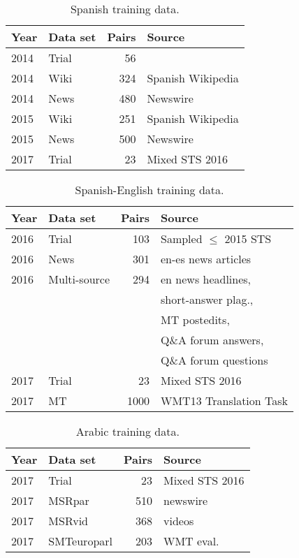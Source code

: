 \documentclass[11pt,a4paper]{article}
\begin{document}
\begin{table}[t]
\small
\begin{center}
\begin{tabular}{|l|l|r|l|} 
\hline
     Year & Data set         & Pairs &  Source\\
\hline
2014 & Trial & 56 & \\
2014 & Wiki  & 324 & Spanish Wikipedia \\
2014 & News  & 480 & Newswire \\
2015 & Wiki  & 251 & Spanish Wikipedia \\
2015 & News  & 500 & Newswire \\
2017 & Trial & 23 & Mixed STS 2016 \\
\hline
\end{tabular}
\end{center}
\caption{Spanish training data.
}
\label{tab:es-summary}
\end{table}


\begin{table}[t]
\small
\begin{center}
\begin{tabular}{|l|l|r|l|} 
\hline
     Year & Data set         & Pairs &  Source\\
\hline
2016 & Trial & 103 & Sampled $\leq$ 2015 STS\\
2016 & News    & 301  & en-es news articles \\
2016 & Multi-source   & 294 & en news headlines, \\
     &                & &  short-answer plag., \\
     &                & & MT postedits,   \\
     &               & & Q\&A forum answers, \\
     &               & & Q\&A forum questions \\
2017 & Trial & 23 & Mixed STS 2016 \\
2017 & MT & 1000 & WMT13 Translation Task \\
\hline
\end{tabular}
\end{center}
\caption{Spanish-English training data.
}
\label{tab:es-en-summary}
\end{table}


\begin{table}[t]
\small
\begin{center}
\begin{tabular}{|l|l|r|l|} 
\hline
     Year & Data set         & Pairs &  Source\\
\hline
2017 & Trial & 23 & Mixed STS 2016 \\
2017 & MSRpar & 510 & newswire\\
2017 & MSRvid & 368 & videos\\
2017 & SMTeuroparl & 203 & WMT eval.\\
\hline
\end{tabular}
\end{center}
\caption{Arabic training data.
}
\label{tab:ar-summary}
\end{table}
\end{document}
